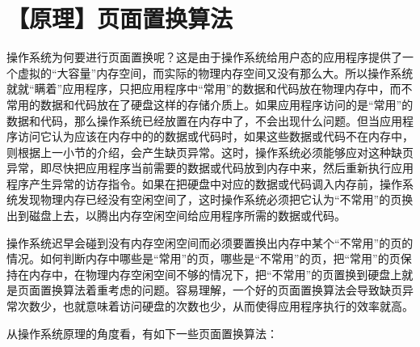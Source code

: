 \section{【原理】页面置换算法}\label{ux539fux7406ux9875ux9762ux7f6eux6362ux7b97ux6cd5}

操作系统为何要进行页面置换呢？这是由于操作系统给用户态的应用程序提供了一个虚拟的``大容量''内存空间，而实际的物理内存空间又没有那么大。所以操作系统就就``瞒着''应用程序，只把应用程序中``常用''的数据和代码放在物理内存中，而不常用的数据和代码放在了硬盘这样的存储介质上。如果应用程序访问的是``常用''的数据和代码，那么操作系统已经放置在内存中了，不会出现什么问题。但当应用程序访问它认为应该在内存中的的数据或代码时，如果这些数据或代码不在内存中，则根据上一小节的介绍，会产生缺页异常。这时，操作系统必须能够应对这种缺页异常，即尽快把应用程序当前需要的数据或代码放到内存中来，然后重新执行应用程序产生异常的访存指令。如果在把硬盘中对应的数据或代码调入内存前，操作系统发现物理内存已经没有空闲空间了，这时操作系统必须把它认为``不常用''的页换出到磁盘上去，以腾出内存空闲空间给应用程序所需的数据或代码。

操作系统迟早会碰到没有内存空闲空间而必须要置换出内存中某个``不常用''的页的情况。如何判断内存中哪些是``常用''的页，哪些是``不常用''的页，把``常用''的页保持在内存中，在物理内存空闲空间不够的情况下，把``不常用''的页置换到硬盘上就是页面置换算法着重考虑的问题。容易理解，一个好的页面置换算法会导致缺页异常次数少，也就意味着访问硬盘的次数也少，从而使得应用程序执行的效率就高。

从操作系统原理的角度看，有如下一些页面置换算法：

